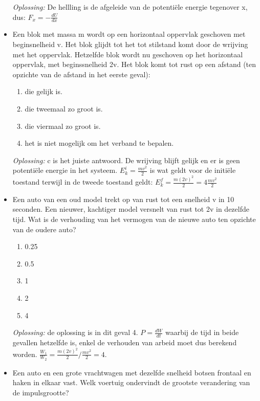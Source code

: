 \documentclass[12pt,a4paper]{article}
\begin{document}
\begin{itemize}
\begin{enumerate}[label=\alph*]
	\end{enumerate}
	\textit{Oplossing:} De hellling is de afgeleide van de potentiële energie tegenover x, dus: \(F_x = -\frac{dU}{dx}\)
	\newline
	\item Een blok met massa m wordt op een horizontaal oppervlak geschoven met beginsnelheid v. Het blok glijdt tot het tot stilstand komt door de wrijving met het oppervlak. Hetzelfde blok wordt nu geschoven op het horizontaal oppervlak, met beginssnelheid 2v. Het blok komt tot rust op een afstand (ten opzichte van de afstand in het eerste geval):
	\begin{enumerate}[label=\alph*]
		\item die gelijk is.
		\item die tweemaal zo groot is.
		\item die viermaal zo groot is.
		\item het is niet mogelijk om het verband te bepalen. 
	\end{enumerate}
	\textit{Oplossing:} c is het juiste antwoord. De wrijving blijft gelijk en er is geen potentiële energie in het systeem. \(E_k^i = \frac{mv^2}{2}\) is wat geldt voor de initiële toestand terwijl in de tweede toestand geldt: \(E_k^f = \frac{m(2v)^2}{2} = 4\frac{mv^2}{2}\)
	\newline
	\item Een auto van een oud model trekt op van rust tot een snelheid v in 10 seconden. Een nieuwer, kachtiger model versnelt van rust tot 2v in dezelfde tijd. Wat is de verhouding van het vermogen van de nieuwe auto ten opzichte van de oudere auto? 
	\begin{enumerate}[label=\alph*]
		\item 0.25
		\item 0.5
		\item 1
		\item 2
		\item 4
	\end{enumerate}
	\textit{Oplossing:} de oplossing is in dit geval 4. \(P = \frac{dW}{dt}\) waarbij de tijd in beide gevallen hetzelfde is, enkel de verhouden van arbeid moet dus berekend worden. \(\frac{W_1}{W_2} = \frac{m(2v)^2}{2} / \frac{mv^2}{2} = 4\).
	\newline 
	\item Een auto en een grote vrachtwagen met dezelfde snelheid botsen frontaal en haken in elkaar vast. Welk voertuig ondervindt de grootste verandering van de impulsgrootte?
	\begin{enumerate}[label=\alph*]

\end{enumerate}
\end{itemize}
\end{document}
